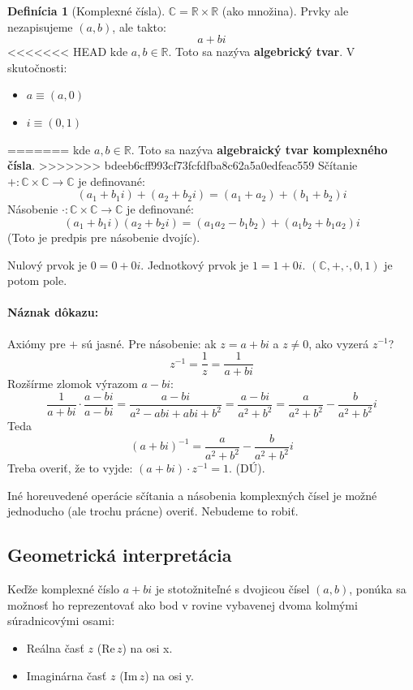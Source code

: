 \documentclass[11pt,a4paper]{article}
\theoremstyle{definition}
\newtheorem{definicia}{Definícia}[section]
\theoremstyle{plain}
\theoremstyle{remark}
\newcommand{\R}{\mathbb{R}}
\begin{document}
\begin{definicia}[Komplexné čísla]
$\mathbb{C} = \R \times \R$ (ako množina). Prvky ale nezapisujeme $(a, b)$, ale takto:
$$ a + bi $$
<<<<<<< HEAD
kde $a, b \in \R$. Toto sa nazýva \textbf{algebrický tvar}.
V skutočnosti:
\begin{itemize}
    \item $a \equiv (a, 0)$
    \item $i \equiv (0, 1)$
\end{itemize}
=======
kde $a, b \in \R$. Toto sa nazýva \textbf{algebraický tvar komplexného čísla}.
>>>>>>> bdeeb6cff993cf73fcfdfba8c62a5a0edfeac559
Sčítanie $+: \mathbb{C} \times \mathbb{C} \to \mathbb{C}$ je definované:
$$ (a_1 + b_1 i) + (a_2 + b_2 i) = (a_1 + a_2) + (b_1 + b_2)i $$
Násobenie $\cdot: \mathbb{C} \times \mathbb{C} \to \mathbb{C}$ je definované:
$$ (a_1 + b_1 i)(a_2 + b_2 i) = (a_1 a_2 - b_1 b_2) + (a_1 b_2 + b_1 a_2)i $$
(Toto je predpis pre násobenie dvojíc).
\end{definicia}

Nulový prvok je $0 = 0 + 0i$. Jednotkový prvok je $1 = 1 + 0i$.
$( \mathbb{C}, +, \cdot, 0, 1 )$ je potom pole.

\paragraph{Náznak dôkazu:} Axiómy pre $+$ sú jasné. Pre násobenie: ak $z = a+bi$ a $z \neq 0$, ako vyzerá $z^{-1}$?
$$ z^{-1} = \frac{1}{z} = \frac{1}{a+bi} $$
Rozšírme zlomok výrazom $a-bi$:
$$ \frac{1}{a+bi} \cdot \frac{a-bi}{a-bi} = \frac{a-bi}{a^2 - abi + abi + b^2} = \frac{a-bi}{a^2+b^2} = \frac{a}{a^2+b^2} - \frac{b}{a^2+b^2}i $$
Teda
$$ (a+bi)^{-1} = \frac{a}{a^2+b^2} - \frac{b}{a^2+b^2}i $$
Treba overiť, že to vyjde: $(a+bi) \cdot z^{-1} = 1$. (DÚ).

Iné horeuvedené operácie sčítania a násobenia komplexných čísel je možné jednoducho (ale trochu prácne) overiť. Nebudeme to robiť.

\subsection*{Geometrická interpretácia}
Keďže komplexné číslo $a+bi$ je stotožniteľné s dvojicou čísel $(a,b)$, ponúka sa možnosť ho reprezentovať ako bod v rovine vybavenej dvoma kolmými súradnicovými osami:
\begin{itemize}
    \item Reálna časť $z$ ($\mathrm{Re}\, z$) na osi x.
    \item Imaginárna časť $z$ ($\mathrm{Im}\, z$) na osi y.
\end{itemize}
\end{document}
